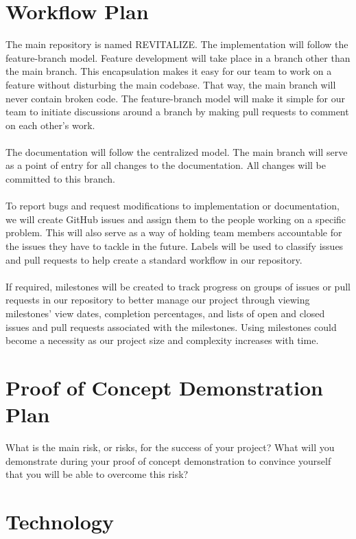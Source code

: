 \documentclass{article}
\begin{document}
\section{Workflow Plan}
The main repository is named REVITALIZE. The implementation will follow the feature-branch model. Feature development will take place in a branch other than the main branch. This encapsulation makes it easy for our team to work on a feature without disturbing the main codebase. That way, the main branch will never contain broken code. The feature-branch model will make it simple for our team to initiate discussions around a branch by making pull requests to comment on each other’s work.\\\\
The documentation will follow the centralized model. The main branch will serve as a point of entry for all changes to the documentation. All changes will be committed to this branch.\\\\
To report bugs and request modifications to implementation or documentation, we will create GitHub issues and assign them to the people working on a specific problem. This will also serve as a way of holding team members accountable for the issues they have to tackle in the future. Labels will be used to classify issues and pull requests to help create a standard workflow in our repository.\\\\
If required, milestones will be created to track progress on groups of issues or pull requests in our repository to better manage our project through viewing milestones’ view dates, completion percentages, and lists of open and closed issues and pull requests associated with the milestones. Using milestones could become a necessity as our project size and complexity increases with time.


\section{Proof of Concept Demonstration Plan}

What is the main risk, or risks, for the success of your project?  What will you
demonstrate during your proof of concept demonstration to convince yourself that
you will be able to overcome this risk?

\section{Technology}
\end{document}
